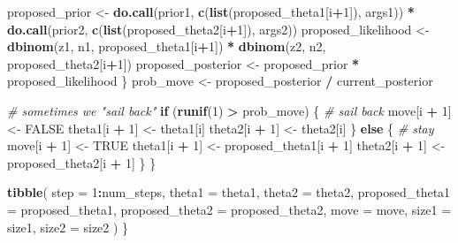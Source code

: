 \documentclass[
  12pt,
]{book}
\newenvironment{Shaded}{\begin{snugshade}}{\end{snugshade}}
\newcommand{\CommentTok}[1]{\textcolor[rgb]{0.56,0.35,0.01}{\textit{#1}}}
\newcommand{\ControlFlowTok}[1]{\textcolor[rgb]{0.13,0.29,0.53}{\textbf{#1}}}
\newcommand{\DataTypeTok}[1]{\textcolor[rgb]{0.13,0.29,0.53}{#1}}
\newcommand{\DecValTok}[1]{\textcolor[rgb]{0.00,0.00,0.81}{#1}}
\newcommand{\KeywordTok}[1]{\textcolor[rgb]{0.13,0.29,0.53}{\textbf{#1}}}
\newcommand{\NormalTok}[1]{#1}
\newcommand{\OperatorTok}[1]{\textcolor[rgb]{0.81,0.36,0.00}{\textbf{#1}}}
\newcommand{\OtherTok}[1]{\textcolor[rgb]{0.56,0.35,0.01}{#1}}
\newcommand{\StringTok}[1]{\textcolor[rgb]{0.31,0.60,0.02}{#1}}
\theoremstyle{definition}
\theoremstyle{definition}
\theoremstyle{definition}
\theoremstyle{remark}
\begin{document}
\begin{Shaded}
\begin{Highlighting}[]
\NormalTok{      proposed_prior <-}\StringTok{ }
\StringTok{        }\KeywordTok{do.call}\NormalTok{(prior1, }\KeywordTok{c}\NormalTok{(}\KeywordTok{list}\NormalTok{(proposed_theta1[i}\OperatorTok{+}\DecValTok{1}\NormalTok{]), args1)) }\OperatorTok{*}
\StringTok{        }\KeywordTok{do.call}\NormalTok{(prior2, }\KeywordTok{c}\NormalTok{(}\KeywordTok{list}\NormalTok{(proposed_theta2[i}\OperatorTok{+}\DecValTok{1}\NormalTok{]), args2))}
\NormalTok{      proposed_likelihood  <-}\StringTok{ }
\StringTok{        }\KeywordTok{dbinom}\NormalTok{(z1, n1, proposed_theta1[i}\OperatorTok{+}\DecValTok{1}\NormalTok{]) }\OperatorTok{*}
\StringTok{        }\KeywordTok{dbinom}\NormalTok{(z2, n2, proposed_theta2[i}\OperatorTok{+}\DecValTok{1}\NormalTok{])}
\NormalTok{      proposed_posterior   <-}\StringTok{ }\NormalTok{proposed_prior }\OperatorTok{*}\StringTok{ }\NormalTok{proposed_likelihood}
\NormalTok{    \}}
\NormalTok{    prob_move           <-}\StringTok{ }\NormalTok{proposed_posterior }\OperatorTok{/}\StringTok{ }\NormalTok{current_posterior}
    
    \CommentTok{# sometimes we "sail back"}
    \ControlFlowTok{if}\NormalTok{ (}\KeywordTok{runif}\NormalTok{(}\DecValTok{1}\NormalTok{) }\OperatorTok{>}\StringTok{ }\NormalTok{prob_move) \{ }\CommentTok{# sail back}
\NormalTok{       move[i }\OperatorTok{+}\StringTok{ }\DecValTok{1}\NormalTok{] <-}\StringTok{ }\OtherTok{FALSE}
\NormalTok{      theta1[i }\OperatorTok{+}\StringTok{ }\DecValTok{1}\NormalTok{] <-}\StringTok{ }\NormalTok{theta1[i]}
\NormalTok{      theta2[i }\OperatorTok{+}\StringTok{ }\DecValTok{1}\NormalTok{] <-}\StringTok{ }\NormalTok{theta2[i]}
\NormalTok{    \} }\ControlFlowTok{else}\NormalTok{ \{                    }\CommentTok{# stay}
\NormalTok{       move[i }\OperatorTok{+}\StringTok{ }\DecValTok{1}\NormalTok{] <-}\StringTok{ }\OtherTok{TRUE}
\NormalTok{      theta1[i }\OperatorTok{+}\StringTok{ }\DecValTok{1}\NormalTok{] <-}\StringTok{ }\NormalTok{proposed_theta1[i }\OperatorTok{+}\StringTok{ }\DecValTok{1}\NormalTok{]}
\NormalTok{      theta2[i }\OperatorTok{+}\StringTok{ }\DecValTok{1}\NormalTok{] <-}\StringTok{ }\NormalTok{proposed_theta2[i }\OperatorTok{+}\StringTok{ }\DecValTok{1}\NormalTok{]}
\NormalTok{    \}}
\NormalTok{  \}}
  
  \KeywordTok{tibble}\NormalTok{(}
    \DataTypeTok{step =} \DecValTok{1}\OperatorTok{:}\NormalTok{num_steps, }
    \DataTypeTok{theta1 =}\NormalTok{ theta1,}
    \DataTypeTok{theta2 =}\NormalTok{ theta2,}
    \DataTypeTok{proposed_theta1 =}\NormalTok{ proposed_theta1,}
    \DataTypeTok{proposed_theta2 =}\NormalTok{ proposed_theta2,}
    \DataTypeTok{move =}\NormalTok{ move, }
    \DataTypeTok{size1 =}\NormalTok{ size1,}
    \DataTypeTok{size2 =}\NormalTok{ size2}
\NormalTok{  )}
\NormalTok{\}}
\end{Highlighting}
\end{Shaded}
\end{document}
